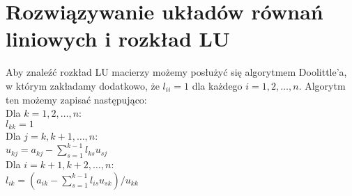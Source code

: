 \documentclass[12pt,a4paper]{article}
\theoremstyle{definition}
\begin{document}
	\section*{Rozwiązywanie układów równań liniowych i rozkład LU}
Aby znaleźć rozkład LU macierzy możemy posłużyć się  algorytmem Doolittle'a, w którym zakładamy dodatkowo, że $l_{ii}=1$ dla każdego $i=1,2,\ldots,n$. Algorytm ten możemy zapisać następująco:\\
Dla $k=1,2,\ldots,n$:\\
\hspace*{0.5cm} $l_{kk}=1$\\
\hspace*{0.5cm} Dla $j=k,k+1,\ldots,n$:\\
\hspace*{1cm} $u_{kj}=a_{kj}-\sum_{s=1}^{k-1}l_{ks}u_{sj}$\\
\hspace*{0.5cm} Dla $i=k+1,k+2,\ldots,n$:\\
\hspace*{1cm} $l_{ik}=(a_{ik}-\sum_{s=1}^{k-1}l_{is}u_{sk})/u_{kk}$
\end{document}

